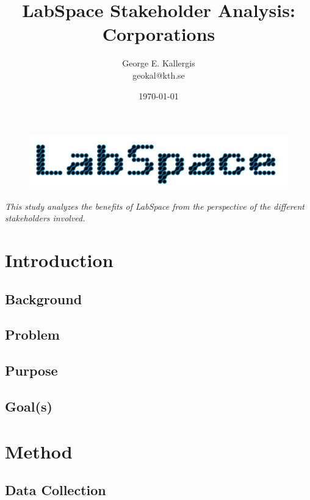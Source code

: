 \documentclass[a4paper, 11pt]{article}
\title{LabSpace Stakeholder Analysis: Corporations}
\author{George E. Kallergis\\geokal@kth.se}
\date{\today{}}
\begin{document}
\maketitle

\begin{figure}[h!]
  \begin{center}
    \includegraphics[width=\textwidth,height=\textheight,keepaspectratio]{imagery/logo.png}
    \label{fig:dneaf}
  \end{center}
\end{figure}

\textit{This study analyzes the benefits of LabSpace from the perspective of the different stakeholders involved.}

\newpage

\section{Introduction}

\subsection{Background}

\subsection{Problem}

\subsection{Purpose}

\subsection{Goal(s)}

\section{Method}

\subsection{Data Collection}
\end{document}
